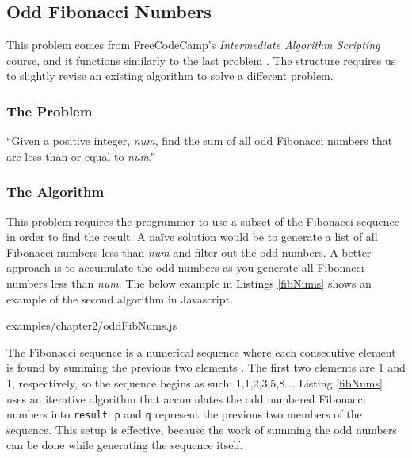 \documentclass[12pt, oneside, a4paper]{book}
\begin{document}
         \subsection{Odd Fibonacci Numbers}
         This problem comes from FreeCodeCamp's \textit{Intermediate Algorithm Scripting} course, and it functions similarly to the last problem \autocite{freecodecampLearnIntermediateAlgorithm}.
         The structure requires us to slightly revise an existing algorithm to solve a different problem.

         \subsubsection{The Problem}
         ``Given a positive integer, \textit{num}, find the sum of all odd Fibonacci numbers that are less than or equal to \textit{num}.''

         \subsubsection{The Algorithm}
         This problem requires the programmer to use a subset of the Fibonacci sequence in order to find the result.
         A naïve solution would be to generate a list of all Fibonacci numbers less than \textit{num} and filter out the odd numbers.
         A better approach is to accumulate the odd numbers as you generate all Fibonacci numbers less than \textit{num}.
         The below example in Listings \ref{fibNums} shows an example of the second algorithm in Javascript.

         
         {examples/chapter2/oddFibNums.js}

         The Fibonacci sequence is a numerical sequence where each consecutive element is found by summing the previous two elements \autocite{parshallFibonacciSequence}.
         The first two elements are 1 and 1, respectively, so the sequence begins as such: 1,1,2,3,5,8\ldots.
         Listing \ref{fibNums} uses an iterative algorithm that accumulates the odd numbered Fibonacci numbers into \lstinline!result!.
         \lstinline!p! and \lstinline!q! represent the previous two members of the sequence.
         This setup is effective, because the work of summing the odd numbers can be done while generating the sequence itself.
\end{document}
